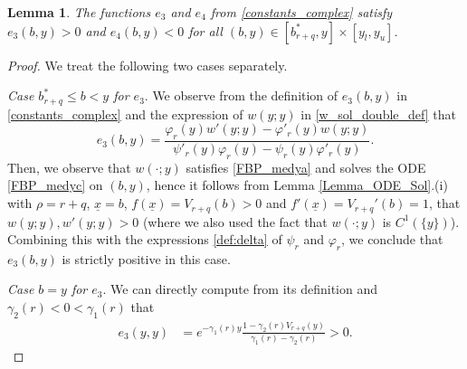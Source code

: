 \documentclass[11pt]{article} %
\newtheorem{lemma}[theorem]{Lemma}
\renewcommand{\phi}{\varphi}
\newcommand{\ubar}[1]{\underaccent{\bar}{#1}}
\numberwithin{komcounter}{section}
\renewcommand{\ubar}{\underline}
\renewcommand{\bar}{\overline}
\numberwithin{equation}{section}
\numberwithin{theorem}{section}
\begin{document}
\begin{lemma} \label{lemma_c_sign}
The functions $e_3$ and $e_4$ from \eqref{constants_complex} satisfy $e_3(b,y)>0$ and $e_4(b,y)<0$ for all $(b,y) \in [b_{r+q}^*,y] \times [y_l,y_u]$.
\end{lemma}
\begin{proof}
We treat the following two cases separately. 

{\it Case $b^*_{r+q} \leq b <y$ for $e_3$}. 
We observe from the definition of $e_3(b,y)$ in \eqref{constants_complex} and the expression of $w(y;y)$ in \eqref{w_sol_double_def}
that 
$$
e_3(b,y) = \frac{\phi_{r}(y) w'(y;y) -\phi'_{r}(y) w(y;y)}{\psi'_{r}(y) \phi_{r}(y) -\psi_{r}(y) \phi'_{r}(y)}.
$$
Then, we observe that $w(\cdot;y)$ satisfies \eqref{FBP_medya} and solves the ODE \eqref{FBP_medyc} on $(b,y)$, hence it follows from Lemma \ref{Lemma_ODE_Sol}.(i) with $\rho=r+q$, $\ubar{x} = b$, $f(\ubar{x}) = V_{r+q}(b) > 0$ and $f'(\ubar{x}) = V_{r+q}'(b) = 1$, that $w(y;y), w'(y;y) > 0$ (where we also used the fact that $w(\cdot;y)$ is $C^1(\{y\})$). 
Combining this with the expressions \eqref{def:delta} of $\psi_r$ and $\phi_r$, we conclude that $e_3(b,y)$ is strictly positive in this case. 

{\it Case $b=y$ for $e_3$}. 
We can directly compute from its definition and $\gamma_2(r) < 0 < \gamma_1(r)$ that
\begin{align*}
e_3(y,y)&=e^{-\gamma_1(r)y}\frac{1-\gamma_2(r)V_{r+q}(y)}{\gamma_1(r)-\gamma_2(r)}>0.
\end{align*}


\end{proof}
\end{document}
